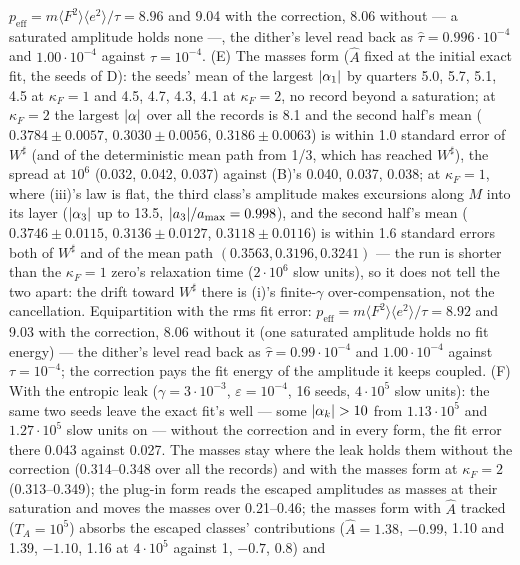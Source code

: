 \begin{sloppypar}
$p_{\mathrm{eff}} = m\langle F^2\rangle\langle e^2\rangle/\tau = 8.96$ and 9.04 with the correction, 8.06 without --- a
saturated amplitude holds none ---, the dither's level read back as $\hat\tau = 0.996\cdot10^{-4}$ and
$1.00\cdot10^{-4}$ against $\tau = 10^{-4}$. (E) The masses form ($\hat A$ fixed at the initial exact fit, the seeds of
D): the seeds' mean of the largest $\lvert \alpha_1\rvert$ by quarters 5.0, 5.7, 5.1, 4.5 at $\kappa_F = 1$ and 4.5, 4.7, 4.3,
4.1 at $\kappa_F = 2$, no record beyond a saturation; at $\kappa_F = 2$ the largest $\lvert \alpha\rvert$ over all the records
is 8.1 and the second half's mean ($0.3784\pm0.0057$, $0.3030\pm0.0056$, $0.3186\pm0.0063$) is within 1.0 standard
error of $W^\sharp$ (and of the deterministic mean path from 1/3, which has reached $W^\sharp$), the spread at $10^6$
(0.032, 0.042, 0.037) against (B)'s 0.040, 0.037, 0.038; at $\kappa_F = 1$, where (iii)'s law is flat, the third
class's amplitude makes excursions along $M$ into its layer ($\lvert \alpha_3\rvert$ up to 13.5, $\lvert a_3\rvert/a_{\max} = 0.998$),
and the second half's mean ($0.3746\pm0.0115$, $0.3136\pm0.0127$, $0.3118\pm0.0116$) is within 1.6 standard errors
both of $W^\sharp$ and of the mean path $(0.3563, 0.3196, 0.3241)$ --- the run is shorter than the $\kappa_F = 1$
zero's relaxation time ($2\cdot10^6$ slow units), so it does not tell the two apart: the drift toward $W^\sharp$ there
is (i)'s finite-$\gamma$ over-compensation, not the cancellation. Equipartition with the rms fit error:
$p_{\mathrm{eff}} = m\langle F^2\rangle\langle e^2\rangle/\tau = 8.92$ and 9.03 with the correction, 8.06 without it
(one saturated amplitude holds no fit energy) --- the dither's level read back as $\hat\tau = 0.99\cdot10^{-4}$ and
$1.00\cdot10^{-4}$ against $\tau = 10^{-4}$; the correction pays the fit energy of the amplitude it keeps coupled.
(F) With the entropic leak ($\gamma = 3\cdot10^{-3}$, $\varepsilon = 10^{-4}$, 16 seeds, $4\cdot10^5$ slow units): the
same two seeds leave the exact fit's well --- some $\lvert \alpha_k\rvert > 10$ from $1.13\cdot10^5$ and $1.27\cdot10^5$ slow
units on --- without the correction and in every form, the fit error there 0.043 against 0.027. The masses stay where
the leak holds them without the correction (0.314--0.348 over all the records) and with the masses form at
$\kappa_F = 2$ (0.313--0.349); the plug-in form reads the escaped amplitudes as masses at their saturation and moves
the masses over 0.21--0.46; the masses form with $\hat A$ tracked ($T_A = 10^5$) absorbs the escaped classes'
contributions ($\hat A = 1.38$, $-0.99$, 1.10 and 1.39, $-1.10$, 1.16 at $4\cdot10^5$ against 1, $-0.7$, 0.8) and

\end{sloppypar}
